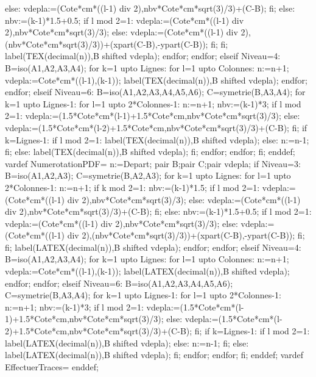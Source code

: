 {          else:
          vdepla:=(Cote*cm*((l-1) div 2),nbv*Cote*cm*sqrt(3)/3)+(C-B);
          fi;
          else:
          nbv:=(k-1)*1.5+0.5;
        if l mod 2=1:
        vdepla:=(Cote*cm*((l-1) div 2),nbv*Cote*cm*sqrt(3)/3);
        else:
        vdepla:=(Cote*cm*((l-1) div 2),(nbv*Cote*cm*sqrt(3)/3))+(xpart(C-B),-ypart(C-B));
        fi;
        fi;
        label(TEX(decimal(n)),B shifted vdepla);
    endfor;
  endfor;
  elseif Niveau=4:
  B=iso(A1,A2,A3,A4);
  for k=1 upto Lignes:
  for l=1 upto Colonnes:
  n:=n+1;
  vdepla:=Cote*cm*((l-1),(k-1));
  label(TEX(decimal(n)),B shifted vdepla);
  endfor;
  endfor;
  elseif Niveau=6:
  B=iso(A1,A2,A3,A4,A5,A6);
  C=symetrie(B,A3,A4);
    for k=1 upto Lignes-1:
      for l=1 upto 2*Colonnes-1:
        n:=n+1;
        nbv:=(k-1)*3;
        if l mod 2=1:
          vdepla:=(1.5*Cote*cm*(l-1)+1.5*Cote*cm,nbv*Cote*cm*sqrt(3)/3);
        else:
          vdepla:=(1.5*Cote*cm*(l-2)+1.5*Cote*cm,nbv*Cote*cm*sqrt(3)/3)+(C-B);
        fi;
        if k=Lignes-1:
        if l mod 2=1:
        label(TEX(decimal(n)),B shifted vdepla);
        else:
        n:=n-1;
        fi;
        else:
        label(TEX(decimal(n)),B shifted vdepla);
        fi;
      endfor;
    endfor;
  fi;
  enddef;
  vardef NumerotationPDF=
  n:=Depart;
  pair B;pair C;pair vdepla;
  if Niveau=3:
    B=iso(A1,A2,A3);
    C=symetrie(B,A2,A3);
    for k=1 upto Lignes:
      for l=1 upto 2*Colonnes-1:
        n:=n+1;
        if k mod 2=1:
        nbv:=(k-1)*1.5;
          if l mod 2=1:
          vdepla:=(Cote*cm*((l-1) div 2),nbv*Cote*cm*sqrt(3)/3);
          else:
          vdepla:=(Cote*cm*((l-1) div 2),nbv*Cote*cm*sqrt(3)/3)+(C-B);
          fi;
          else:
          nbv:=(k-1)*1.5+0.5;
        if l mod 2=1:
        vdepla:=(Cote*cm*((l-1) div 2),nbv*Cote*cm*sqrt(3)/3);
        else:
        vdepla:=(Cote*cm*((l-1) div 2),(nbv*Cote*cm*sqrt(3)/3))+(xpart(C-B),-ypart(C-B));
        fi;
        fi;
        label(LATEX(decimal(n)),B shifted vdepla);
    endfor;
  endfor;
  elseif Niveau=4:
  B=iso(A1,A2,A3,A4);
  for k=1 upto Lignes:
  for l=1 upto Colonnes:
  n:=n+1;
  vdepla:=Cote*cm*((l-1),(k-1));
  label(LATEX(decimal(n)),B shifted vdepla);
  endfor;
  endfor;
  elseif Niveau=6:
  B=iso(A1,A2,A3,A4,A5,A6);
  C=symetrie(B,A3,A4);
    for k=1 upto Lignes-1:
      for l=1 upto 2*Colonnes-1:
        n:=n+1;
        nbv:=(k-1)*3;
        if l mod 2=1:
          vdepla:=(1.5*Cote*cm*(l-1)+1.5*Cote*cm,nbv*Cote*cm*sqrt(3)/3);
        else:
          vdepla:=(1.5*Cote*cm*(l-2)+1.5*Cote*cm,nbv*Cote*cm*sqrt(3)/3)+(C-B);
        fi;
        if k=Lignes-1:
        if l mod 2=1:
        label(LATEX(decimal(n)),B shifted vdepla);
        else:
        n:=n-1;
        fi;
        else:
        label(LATEX(decimal(n)),B shifted vdepla);
        fi;
      endfor;
    endfor;
  fi;
  enddef;
  vardef EffectuerTraces=
  enddef;
}%

